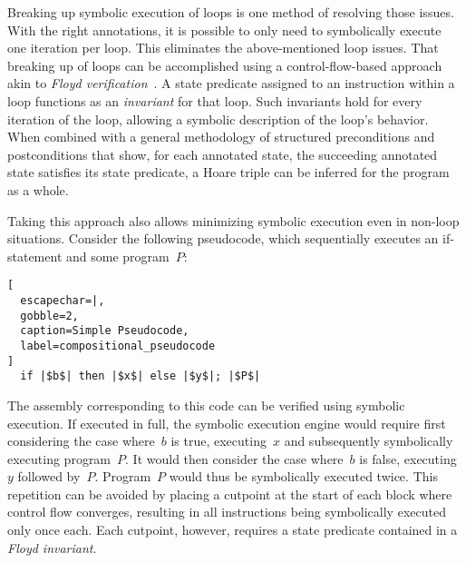 Breaking up symbolic execution of loops is one method of resolving those issues.
With the right annotations,
it is possible to only need to symbolically execute one iteration per loop.
This eliminates the above-mentioned loop issues.
That breaking up of loops can be accomplished using a control-flow-based approach
akin to \emph{Floyd verification}~\citep{floyd1967assigning}.
A state predicate assigned to an instruction within a loop
functions as an \emph{invariant} for that loop.
Such invariants hold for every iteration of the loop,
allowing a symbolic description of the loop's behavior.
When combined with a general methodology
of structured preconditions and postconditions that show,
for each annotated state, the succeeding annotated state satisfies its state predicate,
a Hoare triple can be inferred for the program as a whole.

Taking this approach also allows minimizing symbolic execution
even in non-loop situations.
Consider the following pseudocode,
which sequentially executes an if-statement and some program~$P$:
\begin{lstlisting}[
  escapechar=|,
  gobble=2,
  caption=Simple Pseudocode,
  label=compositional_pseudocode
]
  if |$b$| then |$x$| else |$y$|; |$P$|
\end{lstlisting}
The assembly corresponding to this code can be verified using symbolic execution.
If executed in full, the symbolic execution engine
would require first considering the case where~$b$ is true,
executing~$x$ and subsequently symbolically executing program~$P$.
It would then consider the case where~$b$ is false, executing~$y$ followed by~$P$.
Program~$P$ would thus be symbolically executed twice.
This repetition can be avoided
by placing a cutpoint at the start of each block where control flow converges,
resulting in all instructions being symbolically executed only once each.
Each cutpoint, however, requires a state predicate contained
in a \emph{Floyd invariant}.

